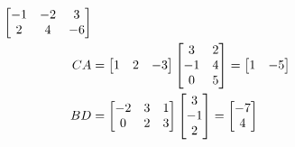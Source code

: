 \documentclass[handout]{ximera}
\begin{document}
\begin{exercise}
\begin{exercise}
\begin{align*}
\begin{bmatrix}
  {-1}  & {-2}   & {3}\\   {2}  &  {4}   & {-6} \end{bmatrix} \\
CA &= \begin{bmatrix}  1  &   2 &   -3\end{bmatrix}
	\begin{bmatrix}  3   &  2\\   -1  &  4\\   0   &  5 \end{bmatrix}
	= \begin{bmatrix}    {1} &   {-5}  \end{bmatrix} \\
BD &= \begin{bmatrix}   -2  &  3  &  1\\  0  &  2  &  3 \end{bmatrix}
	\begin{bmatrix} 3\\  -1\\ 2  \end{bmatrix}
	= \begin{bmatrix}  {-7} \\ {4}  \end{bmatrix}
\end{align*}

\end{exercise}
\end{exercise}
\end{document}
